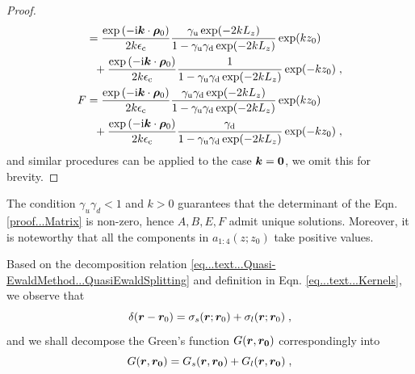 \begin{proof}
\begin{align*}
&=\frac{\exp{(-\mathrm{i} \boldsymbol{k} \cdot \boldsymbol{\rho}_0)}}{2k\epsilon_{\mathrm{c}}}\frac{\gamma_{\mathrm{u}}\exp(-2kL_z)}{1-\gamma_{\mathrm{u}}\gamma_{\mathrm{d}}\exp(-2kL_z)} \exp(kz_0)\\&~~+\frac{\exp{(-\mathrm{i} \boldsymbol{k} \cdot \boldsymbol{\rho}_0)}}{2k\epsilon_{\mathrm{c}}}\frac{1}{1-\gamma_{\mathrm{u}}\gamma_{\mathrm{d}}\exp(-2kL_z)}\exp(-kz_0)\;,\\
F&=\frac{\exp{(-\mathrm{i} \boldsymbol{k} \cdot \boldsymbol{\rho}_0)}}{2k\epsilon_{\mathrm{c}}}\frac{\gamma_{\mathrm{u}}\gamma_{\mathrm{d}}\exp(-2kL_z)}{1-\gamma_{\mathrm{u}}\gamma_{\mathrm{d}}\exp(-2kL_z)} \exp(kz_0)\\&~~+\frac{\exp{(-\mathrm{i} \boldsymbol{k} \cdot \boldsymbol{\rho}_0)}}{2k\epsilon_{\mathrm{c}}}\frac{\gamma_{\mathrm{d}}}{1-\gamma_{\mathrm{u}}\gamma_{\mathrm{d}}\exp(-2kL_z)} \exp(-kz_0)\;,
\end{align*}
 and similar procedures can be applied to the case $\bm{k}=\bm{0}$, we omit this for brevity.
\end{proof}
\begin{rmk}\label{Remark...Nonzero+larger}
 The condition $\gamma_u \gamma_d < 1$ and $k > 0$ guarantees that the determinant  of the Eqn. \eqref{proof...Matrix} is non-zero, hence $A,B,E,F$ admit  unique solutions. Moreover, it is noteworthy that all  the components in $a_{1:4}(z;z_0)$ take positive values. 
\end{rmk}
Based on the decomposition relation \eqref{eq...text...Quasi-EwaldMethod...QuasiEwaldSplitting} and definition in Eqn. \eqref{eq...text...Kernels}, we observe that 
\begin{equation}%
   \delta(\V{r}-\V{r}_0)=\sigma_s  (\V{r};\V{r}_0)+\sigma_l  (\V{r};\V{r}_0)\;,
\end{equation}
and we  shall decompose the Green's function  $ G(\boldsymbol{r}, \boldsymbol{r_0})$ correspondingly into
\begin{equation}
    G(\boldsymbol{r}, \boldsymbol{r_0})= G_s(\boldsymbol{r}, \boldsymbol{r_0})+ G_l(\boldsymbol{r}, \boldsymbol{r_0})\;,
\end{equation}
